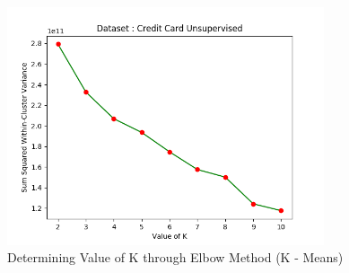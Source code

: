 \documentclass[12pt]{article}
\begin{document}
\begin{figure}[]
	\centering
	\includegraphics[width = 0.7\linewidth, height = 7cm]{Elbow_CreditCard.png}
	\caption{Determining Value of K through Elbow Method (K - Means)}
	\label{fig:elbow_credit}
\end{figure}
\end{document}
